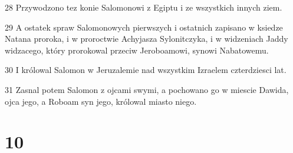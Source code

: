 \par 28 Przywodzono tez konie Salomonowi z Egiptu i ze wszystkich innych ziem.
\par 29 A ostatek spraw Salomonowych pierwszych i ostatnich zapisano w ksiedze Natana proroka, i w proroctwie Achyjasza Sylonitczyka, i w widzeniach Jaddy widzacego, który prorokowal przeciw Jeroboamowi, synowi Nabatowemu.
\par 30 I królowal Salomon w Jeruzalemie nad wszystkim Izraelem czterdziesci lat.
\par 31 Zasnal potem Salomon z ojcami swymi, a pochowano go w miescie Dawida, ojca jego, a Roboam syn jego, królowal miasto niego.

\chapter{10}

